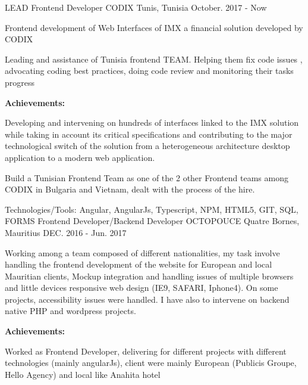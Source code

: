 \begin{cventries}
  \techentries
    {LEAD Frontend Developer}
    {CODIX}
    {Tunis, Tunisia}
    {October. 2017 - Now}
    {
      \begin{cvitems}
        \item {Frontend development of Web Interfaces of IMX a financial solution developed by CODIX }
        \item {Leading and assistance of Tunisia frontend TEAM. Helping them fix code issues , advocating coding best practices, doing code review and monitoring their tasks progress }
      \end{cvitems}
	\vspace{10pt}\textbf{ Achievements:}
      \begin{cvitems}
	{\vspace{14pt}}
        \item {Developing and intervening on hundreds of interfaces linked to the IMX solution while taking in account its critical specifications and contributing to the major technological switch of the solution from a heterogeneous architecture desktop application to a modern web application. }
        \item {Build a Tunisian Frontend Team as one of the 2 other Frontend teams among CODIX in Bulgaria and Vietnam, dealt with the process of the hire. }
      \end{cvitems}
    }
    {\textcolor{awesome}{Technologies/Tools: } {\color{graytext}}  {Angular, AngularJs, Typescript, NPM, HTML5, GIT, SQL, FORMS}}
	{} 
    { 
    }
  \techentries
    {Frontend Developer/Backend Developer}
    {OCTOPOUCE}
    {Quatre Bornes, Mauritius}
    {DEC. 2016 - Jun. 2017}
    {
      \begin{cvitems}
        \item {Working among a team composed of different nationalities, my task involve handling the frontend development of the website for European and local Mauritian clients, Mockup integration and handling issues of multiple browsers and little devices responsive web design (IE9, SAFARI, Iphone4). On some projects, accessibility issues were handled. I have also to intervene on backend native PHP and wordpress projects.}
      \end{cvitems}
	\vspace{10pt}\textbf{ Achievements:}
      \begin{cvitems}
	{\vspace{14pt}}
        \item {Worked as Frontend Developer, delivering for different projects with different technologies (mainly angularJs), client were mainly European (Publicis Groupe, Hello Agency) and local like Anahita hotel }

\end{cvitems}}
\end{cventries}
